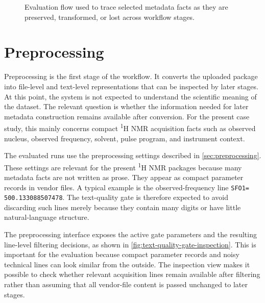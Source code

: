 \begin{figure}[htbp]
    \caption{Evaluation flow used to trace selected metadata facts as they are preserved, transformed, or lost across workflow stages.}
    \label{fig:evaluation-flow}
\end{figure}
\FloatBarrier

\section{Preprocessing}
\label{sec:results-preprocessing}

Preprocessing is the first stage of the workflow.
It converts the uploaded package into file-level and text-level representations that can be inspected by later stages.
At this point, the system is not expected to understand the scientific meaning of the dataset.
The relevant question is whether the information needed for later metadata construction remains available after conversion.
For the present case study, this mainly concerns compact \textsuperscript{1}H \ac{NMR} acquisition facts such as observed nucleus, observed frequency, solvent, pulse program, and instrument context.

The evaluated runs use the preprocessing settings described in \cref{sec:preprocessing}.
These settings are relevant for the present \textsuperscript{1}H \ac{NMR} packages because many metadata facts are not written as prose.
They appear as compact parameter records in vendor files.
A typical example is the observed-frequency line \texttt{SFO1= 500.133088507478}.
The text-quality gate is therefore expected to avoid discarding such lines merely because they contain many digits or have little natural-language structure.

The preprocessing interface exposes the active gate parameters and the resulting line-level filtering decisions, as shown in \cref{fig:text-quality-gate-inspection}.
This is important for the evaluation because compact parameter records and noisy technical lines can look similar from the outside.
The inspection view makes it possible to check whether relevant acquisition lines remain available after filtering rather than assuming that all vendor-file content is passed unchanged to later stages.

